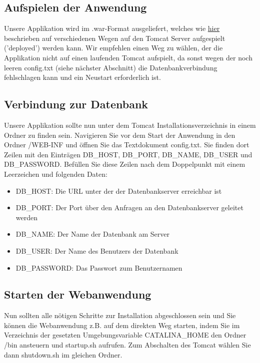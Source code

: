 \documentclass{article}
\begin{document}
\subsection{Aufspielen der Anwendung}
Unsere Applikation wird im .war-Format ausgeliefert, welches wie \href{https://tomcat.apache.org/tomcat-10.0-doc/deployer-howto.html#Deployment_on_Tomcat_startup}{hier} beschrieben auf verschiedenen Wegen auf den Tomcat Server aufgespielt ('deployed') werden kann. Wir empfehlen einen Weg zu wählen, der die Applikation nicht auf einen laufenden Tomcat aufspielt, da sonst wegen der noch leeren config.txt (siehe nächster Abschnitt) die Datenbankverbindung fehlschlagen kann und ein Neustart erforderlich ist.
\subsection{Verbindung zur Datenbank}
Unsere Applikation sollte nun unter dem Tomcat Installationsverzeichnis in einem Ordner zu finden sein. Navigieren Sie vor dem Start der Anwendung in den Ordner /WEB-INF und öffnen Sie das Textdokument config.txt. Sie finden dort Zeilen mit den Einträgen DB\_HOST, DB\_PORT, DB\_NAME, DB\_USER und DB\_PASSWORD. Befüllen Sie diese Zeilen nach dem Doppelpunkt mit einem Leerzeichen und folgenden Daten:
\begin{itemize}
\item DB\_HOST: Die URL unter der der Datenbankserver erreichbar ist
\item DB\_PORT: Der Port über den Anfragen an den Datenbankserver geleitet werden
\item DB\_NAME: Der Name der Datenbank am Server
\item DB\_USER: Der Name des Benutzers der Datenbank
\item DB\_PASSWORD: Das Passwort zum Benutzernamen
\end{itemize}
\subsection{Starten der Webanwendung}
Nun sollten alle nötigen Schritte zur Installation abgeschlossen sein und Sie können die Webanwendung z.B. auf dem direkten Weg starten, indem Sie im Verzeichnis der gesetzten Umgebungsvariable CATALINA\_HOME den Ordner /bin ansteuern und startup.sh aufrufen. Zum Abschalten des Tomcat wählen Sie dann shutdown.sh im gleichen Ordner.
\end{document}
